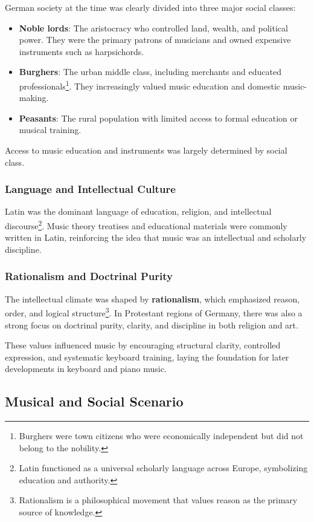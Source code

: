 \documentclass[math,code]{amznotes}
\theoremstyle{remark}
\begin{document}
German society at the time was clearly divided into three major social classes:
\begin{itemize}
    \item \textbf{Noble lords}: The aristocracy who controlled land, wealth, and political power. They were the primary patrons of musicians and owned expensive instruments such as harpsichords.
    \item \textbf{Burghers}: The urban middle class, including merchants and educated professionals\footnote{Burghers were town citizens who were economically independent but did not belong to the nobility.}. They increasingly valued music education and domestic music-making.
    \item \textbf{Peasants}: The rural population with limited access to formal education or musical training.
\end{itemize}
Access to music education and instruments was largely determined by social class.

\subsubsection{Language and Intellectual Culture}

Latin was the dominant language of education, religion, and intellectual discourse\footnote{Latin functioned as a universal scholarly language across Europe, symbolizing education and authority.}. Music theory treatises and educational materials were commonly written in Latin, reinforcing the idea that music was an intellectual and scholarly discipline.

\subsubsection{Rationalism and Doctrinal Purity}

The intellectual climate was shaped by \textbf{rationalism}, which emphasized reason, order, and logical structure\footnote{Rationalism is a philosophical movement that values reason as the primary source of knowledge.}. 
In Protestant regions of Germany, there was also a strong focus on doctrinal purity, clarity, and discipline in both religion and art.

These values influenced music by encouraging structural clarity, controlled expression, and systematic keyboard training, laying the foundation for later developments in keyboard and piano music.

\subsection{Musical and Social Scenario}
\end{document}
